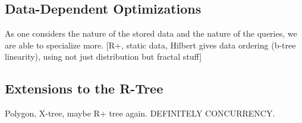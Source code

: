 \subsection{Data-Dependent Optimizations}
As one considers the nature of the stored data and the nature of the queries, we are able to specialize more.
[R+, static data, Hilbert gives data ordering (b-tree linearity), using not just distribution but fractal stuff]

\subsection{Extensions to the R-Tree}
Polygon, X-tree, maybe R+ tree again. DEFINITELY CONCURRENCY.

%
